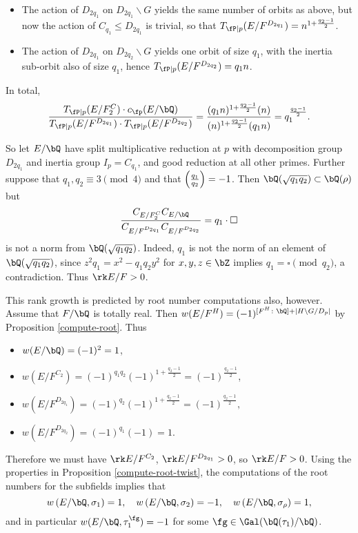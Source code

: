 \begin{example}[Dihedral]
\begin{itemize}[--]
            \item The action of $D_{2 q_1}$ on $D_{2 q_1} \backslash G$ yields the same number of orbits as above, but now the action of $C_{q_1} \leq D_{2 q_1}$ is trivial, so that $T_{\fP \mid p}(E / F^{D_{2 q_1}}) = n^{1 + \frac{q_2 - 1}{2}}$.
            
            \item The action of $D_{2 q_1}$ on $D_{2 q_2} \backslash G$ yields one orbit of size $q_1$, with the inertia sub-orbit also of size $q_1$, hence $T_{\fP \mid p}(E / F^{D_{2 q_2}}) = q_1 n$.
        \end{itemize}
    In total,
    \[ \frac{T_{\fP \mid p}(E / F^C_2) \cdot c_{\fp}(E / \bQ)}{T_{\fP \mid p}(E / F^{D_{2 q_1}})\cdot T_{\fP \mid p}(E / F^{D_{2 q_2}})} = \frac{(q_1 n )^{1 + \frac{q_2 - 1}{2}} (n)}{(n)^{1 + \frac{q_2 - 1}{2}} (q_1 n)} = q_1^{\frac{q_2 - 1}{2}} .\] 

    So let $E / \bQ$ have split multiplicative reduction at $p$ with decomposition group $D_{2 q_1}$ and inertia group $I_p = C_{q_1}$, and good reduction at all other primes. Further suppose that $q_1, q_2 \equiv 3 \pmod 4$ and that $\left( \frac{q_1}{q_2} \right)  = -1$. Then $\bQ(\sqrt{q_1 q_2}) \subset \bQ(\rho)$ but 
$$\frac{C_{E / F^C_2} C_{E / \bQ}}{C_{E / F^{D_{2 q_1}}} C_{E / F^{D_{2 q_2}}}} = q_1 \cdot \square$$
is not a norm from $\bQ(\sqrt{q_1 q_2})$. Indeed, $q_1$ is not the norm of an element of $\bQ(\sqrt{q_1 q_2})$, since $z^2 q_1 = x^2 - q_1q_2 y^2$ for $x,y,z \in \bZ$ implies $q_1 = \square \pmod {q_2}$, a contradiction. Thus $\rk E / F > 0$.

    This rank growth is predicted by root number computations also, however. Assume that $F / \bQ$ is totally real. Then $w(E / F^H) = (-1)^{[F^H \colon \bQ] + | H \backslash G / D_p|}$ by Proposition \ref{compute-root}. Thus
    \begin{itemize}[--]
        \setlength\itemsep{0em}
        \item $w(E / \bQ) = (-1)^2 = 1$,
        \item $w(E / F^{C_2}) = (-1)^{q_1 q_2} (-1)^{1 + \frac{q_2 - 1}{2}} = (-1)^{\frac{q_2 - 1}{2}}$,
        \item $w(E / F^{D_{2 q_1}}) = (-1)^{q_2}(-1)^{1 + \frac{q_2 - 1}{2}} = (-1)^{\frac{q_2 - 1}{2}},$
        \item $w(E / F^{D_{2 q_2}}) = (-1)^{q_1}(-1) = 1$. 
    \end{itemize}
    Therefore we must have $\rk E / F^{C_2}$, $\rk E / F^{D_{2q_1}} > 0$, so $\rk E / F > 0$. 
    Using the properties in Proposition \ref{compute-root-twist}, the computations of the root numbers for the subfields implies that 
    \[ w\left(E / \bQ, \sigma_1\right) = 1, \quad w\left(E / \bQ, \sigma_2\right) = -1, \quad w\left(E / \bQ, \sigma_{\rho}\right) = 1, \]
  and in particular $w(E / \bQ, \tau_1^{\fg}) = -1$ for some $\fg \in \Gal(\bQ(\tau_1) / \bQ)$.
\end{example}

